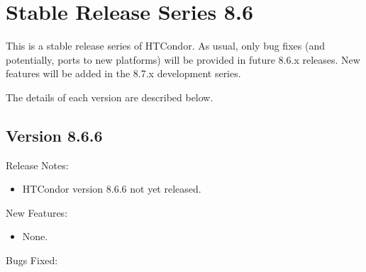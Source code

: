 
\section{\label{sec:History-8-6}Stable Release Series 8.6}

This is a stable release series of HTCondor.
As usual, only bug fixes (and potentially, ports to new platforms)
will be provided in future 8.6.x releases.
New features will be added in the 8.7.x development series.

The details of each version are described below.

\subsection*{\label{sec:New-8-6-6}Version 8.6.6}

\noindent Release Notes:

\begin{itemize}

\item HTCondor version 8.6.6 not yet released.

\end{itemize}


\noindent New Features:

\begin{itemize}

\item None.

\end{itemize}

\noindent Bugs Fixed:

